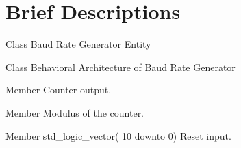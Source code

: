 \chapter{Brief Descriptions}
\hypertarget{brief}{}\label{brief}

\begin{DoxyRefList}
\item[Class \doxylink{classbaud__gen}{baud\+\_\+gen} ]\label{brief__brief000051}%
%
 Baud Rate Generator Entity 
\item[Class \doxylink{classbaud__gen_1_1behavioral}{baud\+\_\+gen.behavioral} ]\label{brief__brief000054}%
%
 Behavioral Architecture of Baud Rate Generator 
\item[Member \doxylink{classbaud__gen_1_1behavioral_a4ddc30b8838c6c2209465b01d30acb6a}{baud\+\_\+gen.behavioral.s\+\_\+reset} ]\label{brief__brief000056}%
%
 Counter output.  
\item[Member \doxylink{classbaud__gen_1_1behavioral_a91db294fcb9fcb66fc8d9ca0f821c4a6}{baud\+\_\+gen.behavioral.sync\+\_\+par\+\_\+counter} ]\label{brief__brief000055}%
%
 Modulus of the counter.  
\item[Member \doxylink{classbaud__gen_a854af6183d8d62f266ebd83de2b04898}{baud\+\_\+gen.divisor} std\+\_\+logic\+\_\+vector( 10 downto  0) ]\label{brief__brief000052}%
%
 Reset input. 




\end{DoxyRefList}

